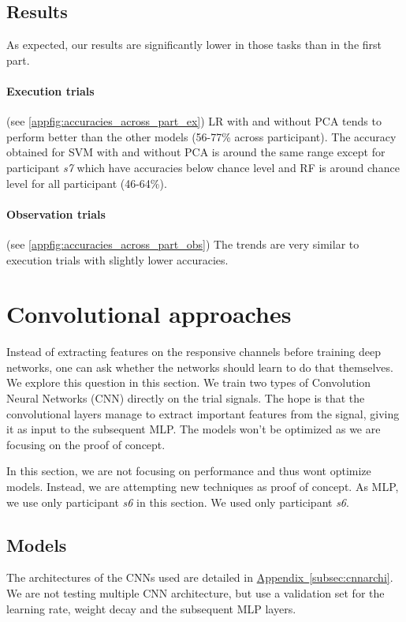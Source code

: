 \documentclass[10pt,conference,compsocconf]{IEEEtran}
\newcommand{\aref}[1]{\hyperref[#1]{Appendix~\ref*{#1}}}
\begin{document}
\subsection{Results}
As expected, our results are significantly lower in those tasks than in the first part.

\paragraph{Execution trials}
(see \ref{appfig:accuracies_across_part_ex}) LR with and without PCA tends to perform better than the other models (56-77\% across participant). The accuracy obtained for SVM with and without PCA is around the same range except for participant \textit{s7} which have accuracies below chance level and RF is around chance level for all participant (46-64\%).

\paragraph{Observation trials}
(see \ref{appfig:accuracies_across_part_obs}) The trends are very similar to execution trials with slightly lower accuracies.

\section{Convolutional approaches}
\label{sec:deeplearning}
Instead of extracting features on the responsive channels before training deep networks, one can ask whether the networks should learn to do that themselves. We explore this question in this section. We train two types of Convolution Neural Networks (CNN) directly on the trial signals. The hope is that the convolutional layers manage to extract important features from the signal, giving it as input to the subsequent MLP. The models won't be optimized as we are focusing on the proof of concept.

In this section, we are not focusing on performance and thus wont optimize models. Instead, we are attempting new techniques as proof of concept. As MLP, we use only participant \textit{s6} in this section. We used only participant \textit{s6}.

\subsection{Models}

The architectures of the CNNs used are detailed in \aref{subsec:cnnarchi}. We are not testing multiple CNN architecture, but use a validation set for the learning rate, weight decay and the subsequent MLP layers.
\end{document}
